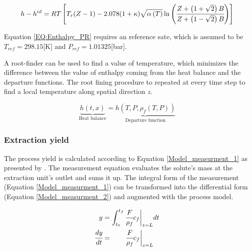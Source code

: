 \documentclass[../Article_Model_Parameters.tex]{subfiles}
\begin{document}
			{\scriptsize
				\begin{equation}
					{\color{black}h}-{\color{black}h}^{id}={\color{black}R}T \left[{\color{black}T_r}({\color{black}Z}-1) -2.078(1+{\color{black}\kappa} ){\sqrt { {\color{black}\alpha}\left(T\right) } } \ln \left(\cfrac{{\color{black}Z}+\left( 1+\sqrt{2} \right){\color{black}B}}{{\color{black}Z}+\left( 1-\sqrt{2} \right){\color{black}B}}\right)\right]
					\label{EQ:Enthalpy_PR}
				\end{equation}				
			}
			
			Equation \ref{EQ:Enthalpy_PR} requires an reference sate, which is assumed to be $T_{ref}=298.15$[K] and $P_{ref}=1.01325$[bar].
			
			A root-finder can be used to find a value of temperature, which minimizes the difference between the value of enthalpy coming from the heat balance and the departure functions. The root fining procedure to repeated at every time step to find a local temperature along spatial direction $z$.
			
			{\footnotesize
				\begin{equation}
					\underbrace{h\left(t,x\right)}_{\text{Heat balance}}=\underbrace{h\left(T,P,\rho_f\left(T,P\right)\right)}_{\text{Departure function}}
					\label{EQ:Enthalpy_root}
				\end{equation}
			}
			
			\subsubsection{Extraction yield} \label{CH: Yield}
			
			The process yield is calculated according to Equation \ref{Model_measurment_1} as presented by \citet{Sovova1994a}. The measurement equation evaluates the solute's mass at the extraction unit's outlet and sums it up. The integral form of the measurement (Equation \ref{Model_measurment_1}) can be transformed into the differential form (Equation \ref{Model_measurment_2}) and augmented with the process model.
			
			{\footnotesize
				\begin{align} 
					\label{Model_measurment_1}
					y &= \int_{t_0}^{t_f} \cfrac{F}{\rho_f} c_f \biggr\rvert_{z=L} dt \\
					\cfrac{dy}{dt} &= \qquad \cfrac{F}{\rho_f} c_f \biggr\rvert_{z=L} 
					\label{Model_measurment_2}
			\end{align}	}
			
\end{document}
